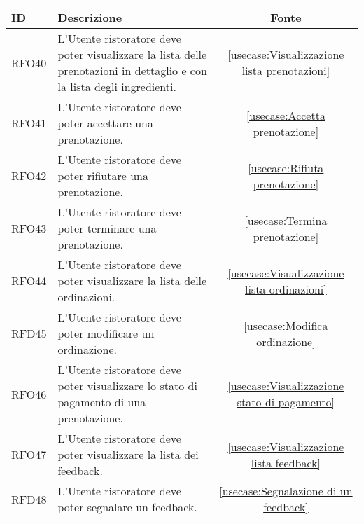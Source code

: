 \begin{table}[H]
	\renewcommand{\arraystretch}{1.5}
	\centering
	\begin{tabularx}{\textwidth}{l|X|c}
		\textbf{ID} & \textbf{Descrizione}                                                                                                    & \textbf{Fonte}                                       \\
		\hline
		RFO40       & L'Utente ristoratore deve poter visualizzare la lista delle prenotazioni in dettaglio e con la lista degli ingredienti. & \autoref{usecase:Visualizzazione lista prenotazioni} \\
		\hline
		RFO41       & L'Utente ristoratore deve poter accettare una prenotazione.                                                             & \autoref{usecase:Accetta prenotazione}               \\
		\hline
		RFO42       & L'Utente ristoratore deve poter rifiutare una prenotazione.                                                             & \autoref{usecase:Rifiuta prenotazione}               \\
		\hline
		RFO43       & L'Utente ristoratore deve poter terminare una prenotazione.                                                             & \autoref{usecase:Termina prenotazione}               \\
		\hline
		RFO44       & L'Utente ristoratore deve poter visualizzare la lista delle ordinazioni.                                                & \autoref{usecase:Visualizzazione lista ordinazioni}  \\
		\hline
		RFD45       & L'Utente ristoratore deve poter modificare un ordinazione.                                                              & \autoref{usecase:Modifica ordinazione}               \\
		\hline
		RFO46       & L'Utente ristoratore deve poter visualizzare lo stato di pagamento di una prenotazione.                                 & \autoref{usecase:Visualizzazione stato di pagamento} \\
		\hline
		RFO47       & L'Utente ristoratore deve poter visualizzare la lista dei feedback.                                                     & \autoref{usecase:Visualizzazione lista feedback}     \\
		\hline
		RFD48       & L'Utente ristoratore deve poter segnalare un feedback.                                                                  & \autoref{usecase:Segnalazione di un feedback}        \\

\end{tabularx}
\end{table}
